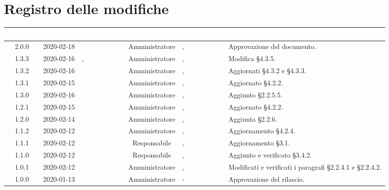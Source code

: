 \section*{Registro delle modifiche}
{
\renewcommand{\arraystretch}{1.5}
\centering
\begin{longtable}{ c c  C{2.5cm} c C{3cm} C{3.5cm}}
\textcolor{white}{\textbf{Versione}}&
\textcolor{white}{\textbf{Data}}&
\textcolor{white}{\textbf{Nominativo}}&
\textcolor{white}{\textbf{Ruolo}}&
\textcolor{white}{\textbf{Verificatore}}&
\textcolor{white}{\textbf{Descrizione}}\\	
\endhead

2.0.0 & 2020-02-18 & \LD{} & Amministratore &  \CE{}, \MC{} & Approvazione del documento.  \\

1.3.3 & 2020-02-16 & \DF{}, \PF{} & Amministratore & \CE{}, \MC{} & Modifica §4.3.5. \\

1.3.2 & 2020-02-16 & \SE{} & Amministratore & \CE{}, \MC{} & Aggiornati §4.3.2 e §4.3.3. \\

1.3.1 & 2020-02-15 & \SE{} & Amministratore & \CE{}, \MC{} & Aggiornato §4.2.2. \\

1.3.0 & 2020-02-16 & \SE{} & Amministratore & \CE{}, \MC{} & Aggiunto §2.2.5.5. \\

1.2.1 & 2020-02-15 & \SE{} & Amministratore & \CE{}, \MC{} & Aggiornato §4.2.2. \\

1.2.0 & 2020-02-14 & \SE{} & Amministratore & \CE{}, \MC{} & Aggiunta §2.2.6. \\

1.1.2 & 2020-02-12 & \SE{} & Amministratore & \CE{}, \MC{} & Aggiornamento §4.2.4. \\ 

1.1.1 & 2020-02-12 & \BR{} & Responsabile & \CE{}, \MC{} & Aggiornamento §3.1. \\ 

1.1.0 & 2020-02-12 & \BR{} & Responsabile & \CE{}, \MC{} & Aggiunto e verificato §3.4.2. \\

1.0.1 & 2020-02-12 & \SE{} & Amministratore & \CE{}, \MC{} & Modificati e verificati i paragrafi §2.2.4.1 e §2.2.4.2. \\ 

1.0.0 & 2020-01-13 & \AT{} & Amministratore & - & Approvazione del  rilascio.  \\


\end{longtable}}
